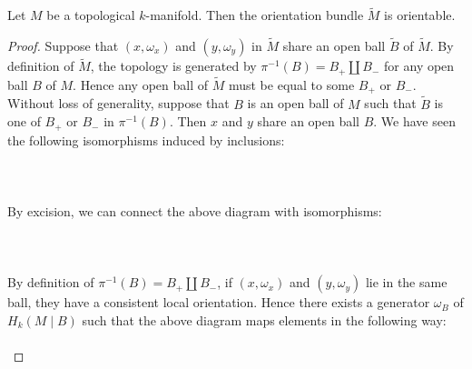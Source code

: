 \documentclass[a4paper]{article}
\begin{document}
\begin{lmm}{}{} Let $M$ be a topological $k$-manifold. Then the orientation bundle $\widetilde{M}$ is orientable. \tcbline
\begin{proof}
Suppose that $(x,\omega_x)$ and $(y,\omega_y)$ in $\widetilde{M}$ share an open ball $\widetilde{B}$ of $\widetilde{M}$. By definition of $\widetilde{M}$, the topology is generated by $\pi^{-1}(B)=B_+\amalg B_-$ for any open ball $B$ of $M$. Hence any open ball of $\widetilde{M}$ must be equal to some $B_+$ or $B_-$. Without loss of generality, suppose that $B$ is an open ball of $M$ such that $\widetilde{B}$ is one of $B_+$ or $B_-$ in $\pi^{-1}(B)$. Then $x$ and $y$ share an open ball $B$. We have seen the following isomorphisms induced by inclusions: \\~\\
\\~\\
By excision, we can connect the above diagram with isomorphisms: \\~\\
\\~\\
By definition of $\pi^{-1}(B)=B_+\amalg B_-$, if $(x,\omega_x)$ and $(y,\omega_y)$ lie in the same ball, they have a consistent local orientation. Hence there exists a generator $\omega_B$ of $H_k(M\;|\;B)$ such that the above diagram maps elements in the following way: \\~\\

\end{proof}
\end{lmm}
\end{document}
